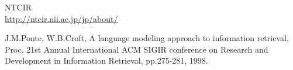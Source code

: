 \documentclass[a4paper,twocolumn,report,10.5pt]{jsbook}
\begin{document}





% 


	


\onecolumn %



\begin{thebibliography}{99} %

\renewcommand{\bibname}{参考文献}

NTCIR \\
\url{http://ntcir.nii.ac.jp/jp/about/}

J.M.Ponte, W.B.Croft, A language modeling approach to information retrieval, 
Proc. 21st Annual International ACM SIGIR conference on Research and Development in Information Retrieval, pp.275-281, 1998.









\end{thebibliography}
\end{document}
